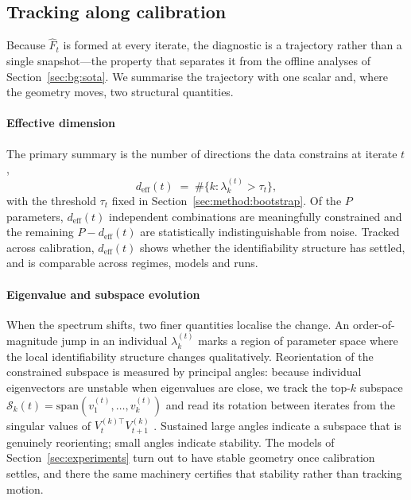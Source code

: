 \documentclass[10pt,twocolumn]{article}
\newcommand{\Fhat}{\hat{F}}
\newcommand{\deff}{d_{\mathrm{eff}}}
\begin{document}
\subsection{Tracking along calibration}
\label{sec:method:trajectory}

Because $\Fhat_t$ is formed at every iterate, the diagnostic is a trajectory rather
than a single snapshot---the property that separates it from the offline analyses of
Section~\ref{sec:bg:sota}. We summarise the trajectory with one scalar and, where the
geometry moves, two structural quantities.

\paragraph{Effective dimension}
The primary summary is the number of directions the data constrains at iterate $t$,
\begin{equation}
  \deff(t) \;=\; \#\big\{k : \lambda_k^{(t)} > \tau_t\big\},
  \label{eq:deff}
\end{equation}
with the threshold $\tau_t$ fixed in Section~\ref{sec:method:bootstrap}. Of the $P$
parameters, $\deff(t)$ independent combinations are meaningfully constrained and the
remaining $P-\deff(t)$ are statistically indistinguishable from noise. Tracked across
calibration, $\deff(t)$ shows whether the identifiability structure has settled, and
is comparable across regimes, models and runs.

\paragraph{Eigenvalue and subspace evolution}
When the spectrum shifts, two finer quantities localise the change. An
order-of-magnitude jump in an individual $\lambda_k^{(t)}$ marks a region of
parameter space where the local identifiability structure changes qualitatively.
Reorientation of the constrained subspace is measured by principal angles: because
individual eigenvectors are unstable when eigenvalues are close, we track the top-$k$
subspace $\mathcal{S}_k(t) = \mathrm{span}(v_1^{(t)}, \dots, v_k^{(t)})$ and read its
rotation between iterates from the singular values of
$V_t^{(k)\top} V_{t+1}^{(k)}$ \citep{transtrum2011geometry}. Sustained large angles
indicate a subspace that is genuinely reorienting; small angles indicate stability.
The models of Section~\ref{sec:experiments} turn out to have stable geometry once
calibration settles, and there the same machinery certifies that stability rather
than tracking motion.
\end{document}
